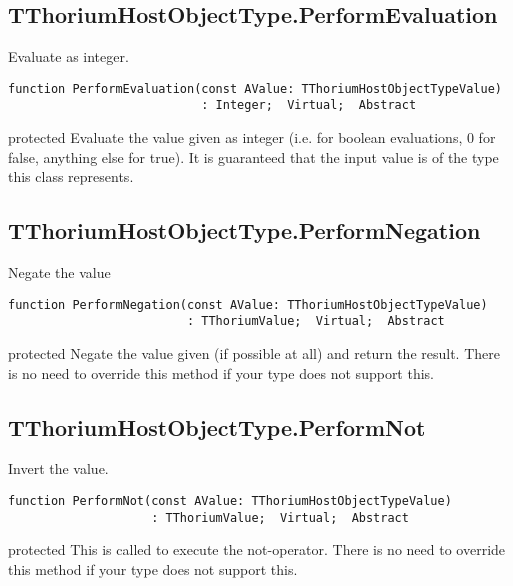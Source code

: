 \subsection{TThoriumHostObjectType.PerformEvaluation}
\label{thoriumcorepkg:thorium:tthoriumhostobjecttype:performevaluation}
\begin{FPCList}
\Synopsis
Evaluate as integer.\Declaration 

\begin{verbatim}
function PerformEvaluation(const AValue: TThoriumHostObjectTypeValue)
                           : Integer;  Virtual;  Abstract
\end{verbatim}
\Visibility
protected
\Description
Evaluate the value given as integer (i.e. for boolean evaluations, 0 for false, anything else for true). It is guaranteed that the input value is of the type this class represents.\end{FPCList}
\subsection{TThoriumHostObjectType.PerformNegation}
\label{thoriumcorepkg:thorium:tthoriumhostobjecttype:performnegation}
\begin{FPCList}
\Synopsis
Negate the value\Declaration 

\begin{verbatim}
function PerformNegation(const AValue: TThoriumHostObjectTypeValue)
                         : TThoriumValue;  Virtual;  Abstract
\end{verbatim}
\Visibility
protected
\Description
Negate the value given (if possible at all) and return the result. There is no need to override this method if your type does not support this.\end{FPCList}
\subsection{TThoriumHostObjectType.PerformNot}
\label{thoriumcorepkg:thorium:tthoriumhostobjecttype:performnot}
\begin{FPCList}
\Synopsis
Invert the value.\Declaration 

\begin{verbatim}
function PerformNot(const AValue: TThoriumHostObjectTypeValue)
                    : TThoriumValue;  Virtual;  Abstract
\end{verbatim}
\Visibility
protected
\Description
This is called to execute the not-operator. There is no need to override this method if your type does not support this.\end{FPCList}
